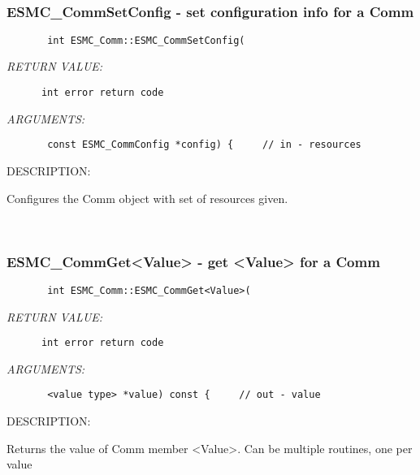  
\mbox{}\hrulefill\ 
 
\subsubsection{ESMC\_CommSetConfig - set configuration info for a Comm}


  
\begin{verbatim}       int ESMC_Comm::ESMC_CommSetConfig(\end{verbatim}{\em RETURN VALUE:}
\begin{verbatim}      int error return code\end{verbatim}{\em ARGUMENTS:}
\begin{verbatim}       const ESMC_CommConfig *config) {     // in - resources\end{verbatim}
{\sf DESCRIPTION:\\ }


      Configures the Comm object with set of resources given.
   
 
\mbox{}\hrulefill\ 
 
\subsubsection{ESMC\_CommGet<Value> - get <Value> for a Comm}


  
\begin{verbatim}       int ESMC_Comm::ESMC_CommGet<Value>(\end{verbatim}{\em RETURN VALUE:}
\begin{verbatim}      int error return code\end{verbatim}{\em ARGUMENTS:}
\begin{verbatim}       <value type> *value) const {     // out - value\end{verbatim}
{\sf DESCRIPTION:\\ }


       Returns the value of Comm member <Value>.
       Can be multiple routines, one per value
   
 
\mbox{}\hrulefill\ 
 
